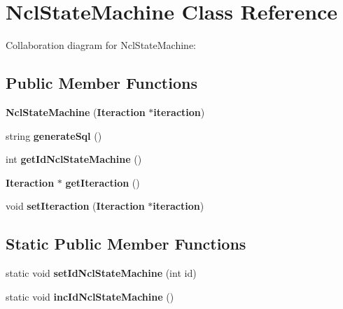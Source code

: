 \section{NclStateMachine Class Reference}
\label{classbr_1_1ufscar_1_1lince_1_1ginga_1_1recommender_1_1NclStateMachine}
Collaboration diagram for NclStateMachine:\subsection*{Public Member Functions}
\begin{CompactItemize}
\item 
\textbf{NclStateMachine} ({\bf Iteraction} $\ast${\bf iteraction})\label{classbr_1_1ufscar_1_1lince_1_1ginga_1_1recommender_1_1NclStateMachine_645c545922e60f8e767da7d05071193b}

\item 
string \textbf{generateSql} ()\label{classbr_1_1ufscar_1_1lince_1_1ginga_1_1recommender_1_1NclStateMachine_8f1e45f781da9a5727416350efd7d586}

\item 
int \textbf{getIdNclStateMachine} ()\label{classbr_1_1ufscar_1_1lince_1_1ginga_1_1recommender_1_1NclStateMachine_84b6ac569767071818a77e56ce101c4c}

\item 
{\bf Iteraction} $\ast$ \textbf{getIteraction} ()\label{classbr_1_1ufscar_1_1lince_1_1ginga_1_1recommender_1_1NclStateMachine_eecb0fedd601a7a23ef288b02553717f}

\item 
void \textbf{setIteraction} ({\bf Iteraction} $\ast${\bf iteraction})\label{classbr_1_1ufscar_1_1lince_1_1ginga_1_1recommender_1_1NclStateMachine_d72b37a8864ff248adf76673711a85ed}

\end{CompactItemize}
\subsection*{Static Public Member Functions}
\begin{CompactItemize}
\item 
static void \textbf{setIdNclStateMachine} (int id)\label{classbr_1_1ufscar_1_1lince_1_1ginga_1_1recommender_1_1NclStateMachine_a858c703dff504e9e2f687830a2f99a4}

\item 
static void \textbf{incIdNclStateMachine} ()\label{classbr_1_1ufscar_1_1lince_1_1ginga_1_1recommender_1_1NclStateMachine_f3259b58f26a249ce6fa479b900e8d86}

\end{CompactItemize}
